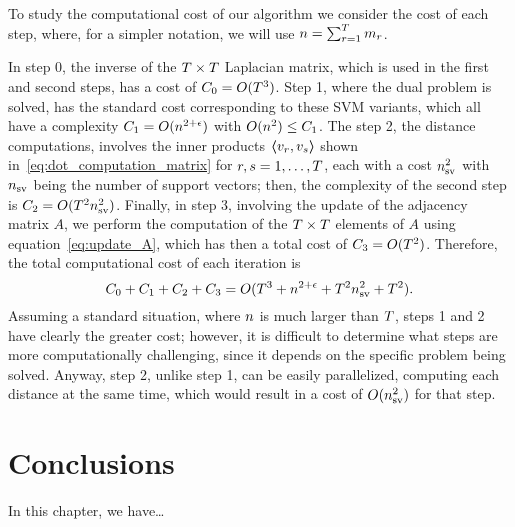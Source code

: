 To study the computational cost of our algorithm we consider the cost of each step, where, for a simpler notation, we will use $n = \sum_{r=1}^T m_r$.

In step 0, the inverse of the $T \times T$ Laplacian matrix, which is used in the first and second steps, has a cost of $C_0 = O(T^3)$.
%
Step 1, where the dual problem is solved, has the standard cost corresponding to these SVM variants, which all have a complexity $C_1 = O(n^{2+\epsilon})$ with $O(n^2) \leq C_1$.
%
The step 2, the distance computations, involves the inner products $\bm{\left\langle} v_r, v_s \bm{\right\rangle}$ shown in~\eqref{eq:dot_computation_matrix} for $r,s=1, \ldots, T$, each with a cost $n_{\text{sv}}^2$ with $n_{\text{sv}}$ being the number of support vectors; then, the complexity of the second step is $C_2 = O(T^2 n_\text{sv}^2)$.
%
Finally, in step 3, involving the update of the adjacency matrix $A$, we perform the computation of the $T \times T$ elements of $A$ using equation~\eqref{eq:update_A}, which has then a total cost of $C_3 = O(T^2)$.
%
Therefore, the total computational cost of each iteration is
$$ C_0 + C_1 + C_2 + C_3 = O(T^3 + n^{2+\epsilon} + T^2 n_\text{sv}^2 + T^2) .$$
%
Assuming a standard situation, where $n$ is much larger than $T$, steps 1 and 2 have clearly the greater cost; however, it is difficult to determine what steps are more computationally challenging, since it depends on the specific problem being solved. Anyway, step 2, unlike step 1, can be easily parallelized, computing each distance at the same time, which would result in a cost of $O(n_\text{sv}^2)$ for that step.




\section{Conclusions}\label{sec-conclusions-4}

In this chapter, we have\dots

